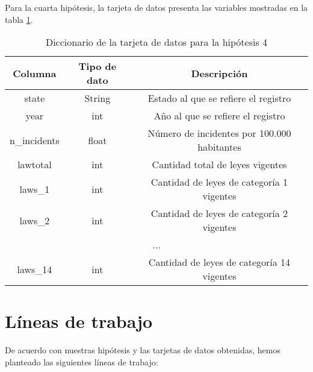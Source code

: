 \documentclass[11pt,a4paper]{article}
\begin{document}
Para la cuarta hipótesis, la tarjeta de datos presenta las variables mostradas en la tabla \ref{tab:datacard_h4}.

\begin{table}[H]
    \centering
\begin{tabular}{|ccc|}
\hline
\multicolumn{1}{|c|}{\textbf{Columna}} & \multicolumn{1}{c|}{\textbf{Tipo de dato}} & \textbf{Descripción}                        \\ \hline
\multicolumn{1}{|c|}{state}            & \multicolumn{1}{c|}{String}                & Estado al que se refiere el registro        \\ \hline
\multicolumn{1}{|c|}{year}             & \multicolumn{1}{c|}{int}                   & Año al que se refiere el registro           \\ \hline
\multicolumn{1}{|c|}{n\_incidents}     & \multicolumn{1}{c|}{float}                 & Número de incidentes por 100.000 habitantes \\ \hline
\multicolumn{1}{|c|}{lawtotal}         & \multicolumn{1}{c|}{int}                   & Cantidad total de leyes vigentes            \\ \hline
\multicolumn{1}{|c|}{laws\_1}          & \multicolumn{1}{c|}{int}                   & Cantidad de leyes de categoría 1 vigentes   \\ \hline
\multicolumn{1}{|c|}{laws\_2}          & \multicolumn{1}{c|}{int}                   & Cantidad de leyes de categoría 2 vigentes   \\ \hline
\multicolumn{3}{|c|}{...}                                                                                                         \\ \hline
\multicolumn{1}{|c|}{laws\_14}         & \multicolumn{1}{c|}{int}                   & Cantidad de leyes de categoría 14 vigentes  \\ \hline
\end{tabular}
    \caption{Diccionario de la tarjeta de datos para la hipótesis 4}
    \label{tab:datacard_h4}
\end{table}

\section{Líneas de trabajo}

De acuerdo con nuestras hipótesis y las tarjetas de datos obtenidas, hemos planteado las siguientes líneas de trabajo:
\end{document}
